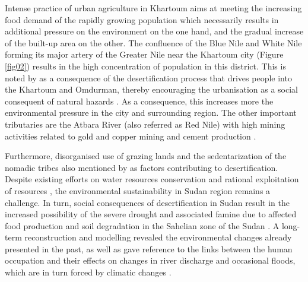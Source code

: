 \documentclass[jimaging,article,submit,pdftex,moreauthors]{Definitions/mdpi}
\begin{document}
Intense practice of urban agriculture in Khartoum aims at meeting the increasing food demand of the rapidly growing population \cite{SCHUMACHER2009399} which necessarily results in additional pressure on the environment on the one hand, and the gradual increase of the built-up area on the other. The confluence of the Blue Nile and White Nile forming its major artery of the Greater Nile near the Khartoum city (Figure \ref{fig02}) results in the high concentration of population in this district. This is noted by as a consequence of the desertification process that drives people into the Khartoum and Omdurman, thereby encouraging the urbanisation as a social consequent of natural hazards \cite{Babiker1982,Mohammed}. As a consequence, this increases more the environmental pressure in the city and surrounding region. The other important tributaries are the Atbara River (also referred as Red Nile) with high mining activities related to gold and copper mining and cement production \cite{SASMAZ2020106539}. 

Furthermore, disorganised use of grazing lands and the sedentarization of the nomadic tribes also mentioned by \cite{Akhtar} as factors contributing to desertification. Despite existing efforts on water resources conservation and rational exploitation of resources \cite{MOHAMEDALI2003237,w10111579}, the environmental sustainability in Sudan region remains a challenge. In turn, social consequences of desertification in Sudan result in the increased possibility of the severe drought and associated famine due to affected food production and soil degradation in the Sahelian zone of the Sudan \cite{Subramaniam}. A long-term reconstruction and modelling revealed the environmental changes already presented in the past, as well as gave reference to the links between the human occupation and their effects on changes in river discharge and occasional floods, which are in turn forced by climatic changes \cite{HONEGGER2015141}.
\end{document}
